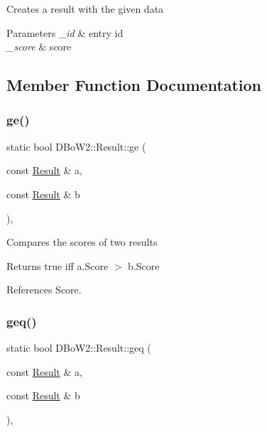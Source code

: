 Creates a result with the given data 
\begin{DoxyParams}{Parameters}
{\em \+\_\+id} & entry id \\
\hline
{\em \+\_\+score} & score \\
\hline
\end{DoxyParams}


\subsection{Member Function Documentation}
\mbox{\label{classDBoW2_1_1Result_ab24992db21ed95d77fa5fc040d45940b}} 
\subsubsection{\texorpdfstring{ge()}{ge()}}
{\footnotesize\ttfamily static bool D\+Bo\+W2\+::\+Result\+::ge (\begin{DoxyParamCaption}\item[{const \hyperlink{classDBoW2_1_1Result}{Result} \&}]{a,  }\item[{const \hyperlink{classDBoW2_1_1Result}{Result} \&}]{b }\end{DoxyParamCaption})\hspace{0.3cm}{\ttfamily [inline]}, {\ttfamily [static]}}

Compares the scores of two results \begin{DoxyReturn}{Returns}
true iff a.\+Score $>$ b.\+Score 
\end{DoxyReturn}


References Score.

\mbox{\label{classDBoW2_1_1Result_afe1567c5a010ebf492a558f60e0f7275}} 
\subsubsection{\texorpdfstring{geq()}{geq()}}
{\footnotesize\ttfamily static bool D\+Bo\+W2\+::\+Result\+::geq (\begin{DoxyParamCaption}\item[{const \hyperlink{classDBoW2_1_1Result}{Result} \&}]{a,  }\item[{const \hyperlink{classDBoW2_1_1Result}{Result} \&}]{b }\end{DoxyParamCaption})\hspace{0.3cm}{\ttfamily [inline]}, {\ttfamily [static]}}

